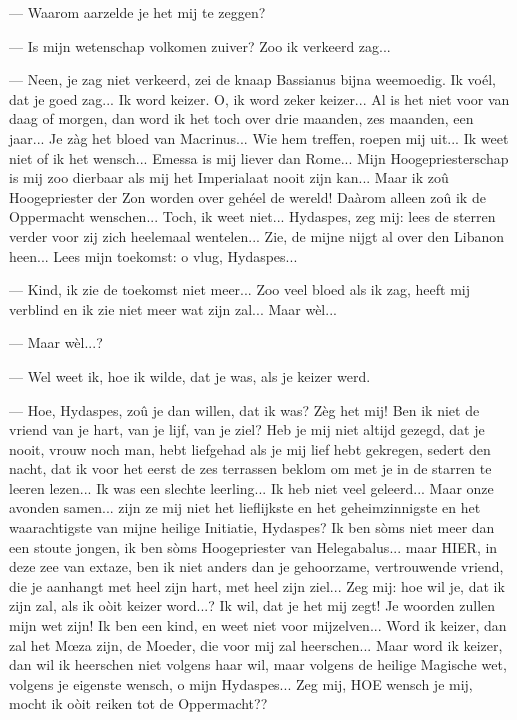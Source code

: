 \documentclass[a4paper, 12pt, oneside, dutch]{article}
\begin{document}
--- Waarom aarzelde je het mij te zeggen?

--- Is mijn wetenschap volkomen zuiver? Zoo ik verkeerd zag...

--- Neen, je zag niet verkeerd, zei de knaap Bassianus bijna weemoedig. Ik voél, dat je goed zag... Ik word keizer. O, ik word zeker keizer... Al is het niet voor van daag of morgen, dan word ik het toch over drie maanden, zes maanden, een jaar... Je zàg het bloed van Macrinus... Wie hem treffen, roepen mij uit... Ik weet niet of ik het wensch... Emessa is mij liever dan Rome... Mijn Hoogepriesterschap is mij zoo dierbaar als mij het Imperialaat nooit zijn kan... Maar ik zoû Hoogepriester der Zon worden over gehéel de wereld! Daàrom alleen zoû ik de Oppermacht wenschen... Toch, ik weet niet... Hydaspes, zeg mij: lees de sterren verder voor zij zich heelemaal wentelen... Zie, de mijne nijgt al over den Libanon heen... Lees mijn toekomst: o vlug, Hydaspes...

--- Kind, ik zie de toekomst niet meer... Zoo veel bloed als ik zag, heeft mij verblind en ik zie niet meer wat zijn zal... Maar wèl...

--- Maar wèl...?

--- Wel weet ik, hoe ik wilde, dat je was, als je keizer werd.

--- Hoe, Hydaspes, zoû je dan willen, dat ik was? Zèg het mij! Ben ik niet de vriend van je hart, van je lijf, van je ziel? Heb je mij niet altijd gezegd, dat je nooit, vrouw noch man, hebt liefgehad als je mij lief hebt gekregen, sedert den nacht, dat ik voor het eerst de zes terrassen beklom om met je in de starren te leeren lezen... Ik was een slechte leerling... Ik heb niet veel geleerd... Maar onze avonden samen... zijn ze mij niet het lieflijkste en het geheimzinnigste en het waarachtigste van mijne heilige Initiatie, Hydaspes? Ik ben sòms niet meer dan een stoute jongen, ik ben sòms Hoogepriester van Helegabalus... maar HIER, in deze zee van extaze, ben ik niet anders dan je gehoorzame, vertrouwende vriend, die je aanhangt met heel zijn hart, met heel zijn ziel... Zeg mij: hoe wil je, dat ik zijn zal, als ik oòit keizer word...? Ik wil, dat je het mij zegt! Je woorden zullen mijn wet zijn! Ik ben een kind, en weet niet voor mijzelven... Word ik keizer, dan zal het Mœza zijn, de Moeder, die voor mij zal heerschen... Maar word ik keizer, dan wil ik heerschen niet volgens haar wil, maar volgens de heilige Magische wet, volgens je eigenste wensch, o mijn Hydaspes... Zeg mij, HOE wensch je mij, mocht ik oòit reiken tot de Oppermacht??
\end{document}
